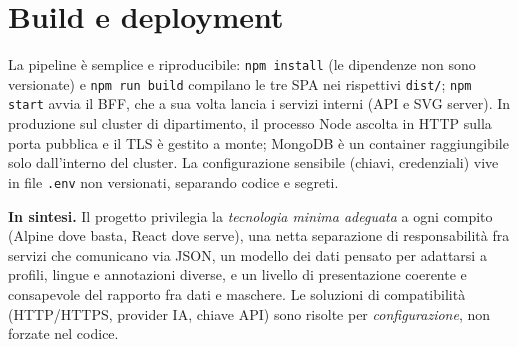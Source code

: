 \documentclass[11pt,a4paper]{article}
\newcommand{\code}[1]{\texttt{#1}}
\begin{document}
\section{Build e deployment}

La pipeline è semplice e riproducibile: \code{npm install} (le dipendenze non
sono versionate) e \code{npm run build} compilano le tre SPA nei rispettivi
\code{dist/}; \code{npm start} avvia il BFF, che a sua volta lancia i servizi
interni (API e SVG server). In produzione sul cluster di dipartimento, il
processo Node ascolta in HTTP sulla porta pubblica e il TLS è gestito a monte;
MongoDB è un container raggiungibile solo dall'interno del cluster. La
configurazione sensibile (chiavi, credenziali) vive in file \code{.env} non
versionati, separando codice e segreti.

\bigskip
\noindent\textbf{In sintesi.} Il progetto privilegia la \emph{tecnologia minima
adeguata} a ogni compito (Alpine dove basta, React dove serve), una netta
separazione di responsabilità fra servizi che comunicano via JSON, un modello
dei dati pensato per adattarsi a profili, lingue e annotazioni diverse, e un
livello di presentazione coerente e consapevole del rapporto fra dati e
maschere. Le soluzioni di compatibilità (HTTP/HTTPS, provider IA, chiave API)
sono risolte per \emph{configurazione}, non forzate nel codice.
\end{document}
